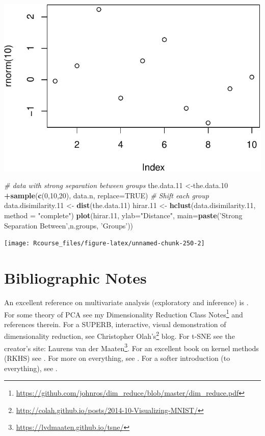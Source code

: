 \documentclass[]{book}
\newenvironment{Shaded}{\begin{snugshade}}{\end{snugshade}}
\newcommand{\CommentTok}[1]{\textcolor[rgb]{0.56,0.35,0.01}{\textit{#1}}}
\newcommand{\DataTypeTok}[1]{\textcolor[rgb]{0.13,0.29,0.53}{#1}}
\newcommand{\DecValTok}[1]{\textcolor[rgb]{0.00,0.00,0.81}{#1}}
\newcommand{\FloatTok}[1]{\textcolor[rgb]{0.00,0.00,0.81}{#1}}
\newcommand{\KeywordTok}[1]{\textcolor[rgb]{0.13,0.29,0.53}{\textbf{#1}}}
\newcommand{\NormalTok}[1]{#1}
\newcommand{\OperatorTok}[1]{\textcolor[rgb]{0.81,0.36,0.00}{\textbf{#1}}}
\newcommand{\OtherTok}[1]{\textcolor[rgb]{0.56,0.35,0.01}{#1}}
\newcommand{\StringTok}[1]{\textcolor[rgb]{0.31,0.60,0.02}{#1}}
\renewcommand{\href}[2]{#2\footnote{\url{#1}}}
\theoremstyle{definition}
\theoremstyle{definition}
\theoremstyle{definition}
\theoremstyle{remark}
\begin{document}
\includegraphics[width=0.5\linewidth]{Rcourse_files/figure-latex/unnamed-chunk-250-1}

\begin{Shaded}
\begin{Highlighting}[]
\CommentTok{# data with strong separation between groups}
\NormalTok{the.data}\FloatTok{.11}\NormalTok{ <-the.data}\FloatTok{.10} \OperatorTok{+}\KeywordTok{sample}\NormalTok{(}\KeywordTok{c}\NormalTok{(}\DecValTok{0}\NormalTok{,}\DecValTok{10}\NormalTok{,}\DecValTok{20}\NormalTok{), data.n, }\DataTypeTok{replace=}\OtherTok{TRUE}\NormalTok{) }\CommentTok{# Shift each group }
\NormalTok{data.disimilarity}\FloatTok{.11}\NormalTok{ <-}\StringTok{ }\KeywordTok{dist}\NormalTok{(the.data}\FloatTok{.11}\NormalTok{)}
\NormalTok{hirar}\FloatTok{.11}\NormalTok{ <-}\StringTok{ }\KeywordTok{hclust}\NormalTok{(data.disimilarity}\FloatTok{.11}\NormalTok{, }\DataTypeTok{method =} \StringTok{"complete"}\NormalTok{)}
\KeywordTok{plot}\NormalTok{(hirar}\FloatTok{.11}\NormalTok{, }\DataTypeTok{ylab=}\StringTok{"Distance"}\NormalTok{, }\DataTypeTok{main=}\KeywordTok{paste}\NormalTok{(}\StringTok{'Strong Separation Between'}\NormalTok{,n.groups, }\StringTok{'Groups'}\NormalTok{))}
\end{Highlighting}
\end{Shaded}

\texttt{[image: Rcourse\_files/figure-latex/unnamed-chunk-250-2]}

\hypertarget{bibliographic-notes-9}{%
\section{Bibliographic Notes}\label{bibliographic-notes-9}}

An excellent reference on multivariate analysis (exploratory and inference) is \citet{izenman2008modern}.
For some theory of PCA see my \href{https://github.com/johnros/dim_reduce/blob/master/dim_reduce.pdf}{Dimensionality Reduction Class Notes} and references therein.
For a SUPERB, interactive, visual demonstration of dimensionality reduction, see \href{http://colah.github.io/posts/2014-10-Visualizing-MNIST/}{Christopher Olah's} blog.
For t-SNE see the creator's site: \href{https://lvdmaaten.github.io/tsne/}{Laurens van der Maaten}.
For an excellent book on kernel methods (RKHS) see \citet{shawe2004kernel}.
For more on everything, see \citet{friedman2001elements}.
For a softer introduction (to everything), see \citet{james2013introduction}.
\end{document}
